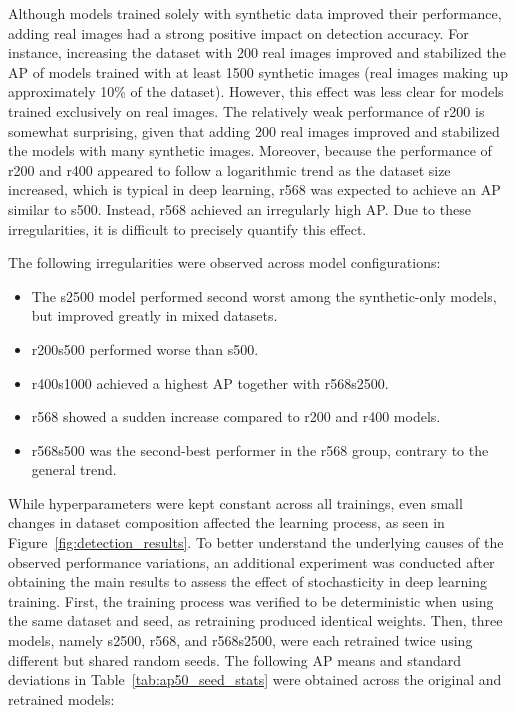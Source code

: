 Although models trained solely with synthetic data improved their performance, adding real images had a strong positive impact on detection accuracy. For instance, increasing the dataset with 200 real images improved and stabilized the AP of models trained with at least 1500 synthetic images (real images making up approximately 10\% of the dataset). However, this effect was less clear for models trained exclusively on real images. The relatively weak performance of r200 is somewhat surprising, given that adding 200 real images improved and stabilized the models with many synthetic images. Moreover, because the performance of r200 and r400 appeared to follow a logarithmic trend as the dataset size increased, which is typical in deep learning, r568 was expected to achieve an AP similar to s500. Instead, r568 achieved an irregularly high AP.
Due to these irregularities, it is difficult to precisely quantify this effect.

The following irregularities were observed across model configurations:

\begin{itemize}
\item The s2500 model performed second worst among the synthetic-only models, but improved greatly in mixed datasets.
\item r200s500 performed worse than s500.
\item r400s1000 achieved a highest AP together with r568s2500.
\item r568 showed a sudden increase compared to r200 and r400 models.
\item r568s500 was the second-best performer in the r568 group, contrary to the general trend.
\end{itemize}

While hyperparameters were kept constant across all trainings, even small changes in dataset composition affected the learning process, as seen in Figure~\ref{fig:detection_results}. To better understand the underlying causes of the observed performance variations, an additional experiment was conducted after obtaining the main results to assess the effect of stochasticity in deep learning training. First, the training process was verified to be deterministic when using the same dataset and seed, as retraining produced identical weights. Then, three models, namely s2500, r568, and r568s2500, were each retrained twice using different but shared random seeds. The following AP means and standard deviations in Table~\ref{tab:ap50_seed_stats} were obtained across the original and retrained models:

